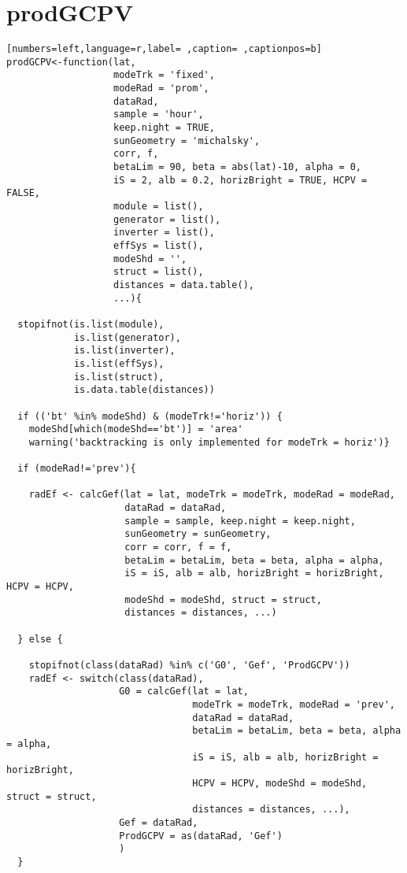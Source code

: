 \section{prodGCPV}
\label{sec:org36c58fd}
\begin{lstlisting}[numbers=left,language=r,label= ,caption= ,captionpos=b]
prodGCPV<-function(lat,
                   modeTrk = 'fixed', 
                   modeRad = 'prom',
                   dataRad,
                   sample = 'hour',
                   keep.night = TRUE,
                   sunGeometry = 'michalsky',
                   corr, f,
                   betaLim = 90, beta = abs(lat)-10, alpha = 0,
                   iS = 2, alb = 0.2, horizBright = TRUE, HCPV = FALSE,
                   module = list(), 
                   generator = list(),
                   inverter = list(), 
                   effSys = list(), 
                   modeShd = '',    
                   struct = list(), 
                   distances = data.table(),
                   ...){
  
  stopifnot(is.list(module),
            is.list(generator),
            is.list(inverter),
            is.list(effSys),
            is.list(struct),
            is.data.table(distances))
  
  if (('bt' %in% modeShd) & (modeTrk!='horiz')) {
    modeShd[which(modeShd=='bt')] = 'area'
    warning('backtracking is only implemented for modeTrk = horiz')}
  
  if (modeRad!='prev'){ 
    
    radEf <- calcGef(lat = lat, modeTrk = modeTrk, modeRad = modeRad,
                     dataRad = dataRad,
                     sample = sample, keep.night = keep.night,
                     sunGeometry = sunGeometry,
                     corr = corr, f = f,
                     betaLim = betaLim, beta = beta, alpha = alpha,
                     iS = iS, alb = alb, horizBright = horizBright, HCPV = HCPV,
                     modeShd = modeShd, struct = struct,
                     distances = distances, ...)
    
  } else { 
    
    stopifnot(class(dataRad) %in% c('G0', 'Gef', 'ProdGCPV'))
    radEf <- switch(class(dataRad),
                    G0 = calcGef(lat = lat,
                                 modeTrk = modeTrk, modeRad = 'prev',
                                 dataRad = dataRad,
                                 betaLim = betaLim, beta = beta, alpha = alpha,
                                 iS = iS, alb = alb, horizBright = horizBright,
                                 HCPV = HCPV, modeShd = modeShd, struct = struct,
                                 distances = distances, ...),
                    Gef = dataRad,
                    ProdGCPV = as(dataRad, 'Gef')
                    )
  }
  

\end{lstlisting}
